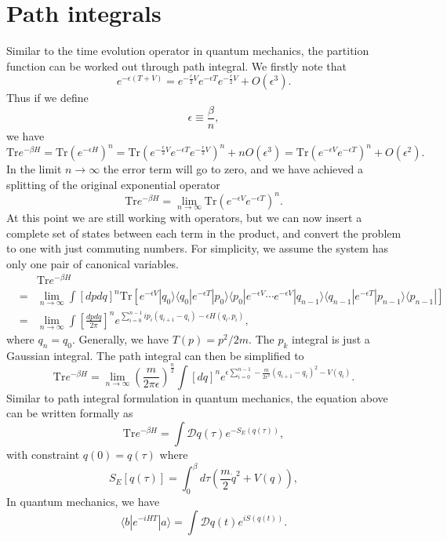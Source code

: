 \section{Path integrals}
Similar to the time evolution operator in quantum mechanics, the partition function can be worked out through path integral. We firstly note that
\[e^{-\epsilon(T+V)} = e^{-\frac{\epsilon}{2} V}e^{-\epsilon T} e^{-\frac{\epsilon}{2} V} + O(\epsilon^3).\]
Thus if we define
\[\epsilon \equiv \frac{\beta}{n},\]
we have
\[\mathrm{Tr}e^{-\beta H} = \mathrm{Tr} \left( e^{-\epsilon H} \right)^n = \mathrm{Tr} \left(e^{-\frac{\epsilon}{2} V}e^{-\epsilon T} e^{-\frac{\epsilon}{2} V}\right)^n + nO(\epsilon^3) = \mathrm{Tr} \left(e^{-\epsilon V}e^{-\epsilon T} \right)^n + O(\epsilon^2).\]
In the limit $n \to \infty$ the error term will go to zero, and we have achieved a splitting of the original exponential operator
\[\mathrm{Tr}e^{-\beta H} = \lim_{n \to \infty} \mathrm{Tr} \left(e^{-\epsilon V}e^{-\epsilon T} \right)^n.\]
At this point we are still working with operators, but we can now insert a complete set of states between each term in the product, and convert the problem to one with just commuting numbers. For simplicity, we assume the system has only one pair of canonical variables.
\begin{eqnarray}
&\phantom{=}& \mathrm{Tr}e^{-\beta H} \nonumber \\
&=& \lim_{n \to \infty} \int [dpdq]^n  \mathrm{Tr} [ e^{-\epsilon V}|q_0\rangle \langle q_0 | e^{-\epsilon T} |p_0 \rangle\langle p_0| e^{-\epsilon V} \cdots e^{-\epsilon V} |q_{n-1}\rangle\langle q_{n-1}| e^{-\epsilon T} |p_{n-1}\rangle\langle p_{n-1} | ] \nonumber \\
&=& \lim_{n \to \infty} \int [\frac{dpdq}{2\pi}]^n e^{\sum_{i=0}^{n-1}ip_i(q_{i+1}-q_i) - \epsilon H(q_i,p_i)} ,\nonumber
\end{eqnarray}
where $q_{n} = q_0$. 
Generally, we have $T(p) = p^2/2m$. The $p_k$ integral is just a Gaussian integral. The path integral can then be simplified to
\[\mathrm{Tr}e^{-\beta H} = \lim_{n \to \infty} \left( \frac{m}{2\pi \epsilon} \right)^{\frac{n}{2}} \int [dq]^n e^{\epsilon \sum_{i=0}^{n-1}  -\frac{m}{2\epsilon^2}(q_{i+1}-q_i)^2 -  V(q_i)} .\]
Similar to path integral formulation in quantum mechanics, the equation above can be written formally as
\[\mathrm{Tr}e^{-\beta H} = \int \mathcal{D}q(\tau) e^{-S_E(q(\tau))},\]
with constraint $q(0) = q(\tau)$
where
\[S_E[q(\tau)] = \int_0^{\beta} d\tau \left(\frac{m}{2}\dot{q}^2 + V(q) \right),\]
In quantum mechanics, we have
\[\langle b | e^{-iHT} | a \rangle = \int \mathcal{D}q(t) e^{iS(q(t))}.\]
